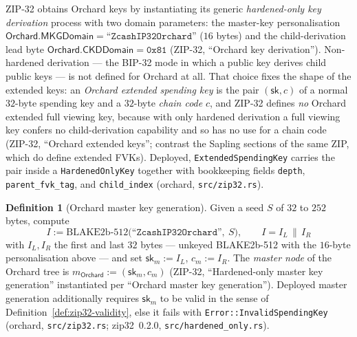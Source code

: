 \documentclass[11pt,a4paper]{article}
\theoremstyle{definition}
\newtheorem{definition}[theorem]{Definition}
\begin{document}
ZIP-32 obtains Orchard keys by instantiating its generic
\emph{hardened-only key derivation} process with two domain parameters: the
master-key personalisation
$\mathsf{Orchard.MKGDomain} = \texttt{``ZcashIP32Orchard''}$ ($16$ bytes)
and the child-derivation lead byte
$\mathsf{Orchard.CKDDomain} = \mathtt{0x81}$ (ZIP-32, ``Orchard key
derivation''). Non-hardened derivation --- the BIP-32 mode in which a public
key derives child public keys --- is not defined for Orchard at all. That
choice fixes the shape of the extended keys: an \emph{Orchard extended
spending key} is the pair $(\mathsf{sk}, c)$ of a normal $32$-byte spending
key and a $32$-byte \emph{chain code} $c$, and ZIP-32 defines \emph{no}
Orchard extended full viewing key, because with only hardened derivation a
full viewing key confers no child-derivation capability and so has no use
for a chain code (ZIP-32, ``Orchard extended keys''; contrast the Sapling
sections of the same ZIP, which do define extended FVKs). Deployed,
\texttt{ExtendedSpendingKey} carries the pair inside a
\texttt{HardenedOnlyKey} together with bookkeeping fields
\texttt{depth}, \texttt{parent\_fvk\_tag}, and \texttt{child\_index}
(\textsf{orchard}, \texttt{src/zip32.rs}).

\begin{definition}[Orchard master key generation]\label{def:zip32-master}
Given a seed $S$ of $32$ to $252$ bytes, compute
\[
I := \mathrm{BLAKE2b\text{-}512}\bigl(\texttt{``ZcashIP32Orchard''},\ S\bigr),
\qquad I = I_L \,\|\, I_R
\]
with $I_L, I_R$ the first and last $32$ bytes --- unkeyed BLAKE2b-512 with
the $16$-byte personalisation above --- and set
$\mathsf{sk}_m := I_L$, $c_m := I_R$. The \emph{master node} of the Orchard
tree is $m_{\mathsf{Orchard}} := (\mathsf{sk}_m, c_m)$ (ZIP-32,
``Hardened-only master key generation'' instantiated per ``Orchard master
key generation''). Deployed master generation additionally requires
$\mathsf{sk}_m$ to be valid in the sense of
Definition~\ref{def:zip32-validity}, else it fails with
\texttt{Error::InvalidSpendingKey} (\textsf{orchard}, \texttt{src/zip32.rs};
\textsf{zip32}~0.2.0, \texttt{src/hardened\_only.rs}).
\end{definition}
\end{document}
